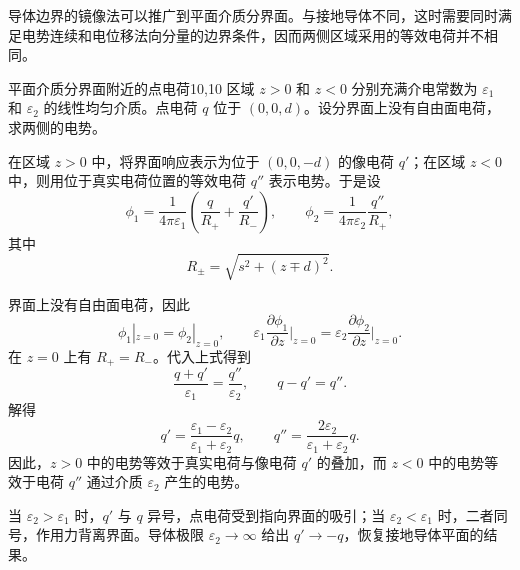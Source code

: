 导体边界的镜像法可以推广到平面介质分界面。与接地导体不同，这时需要同时满足电势连续和电位移法向分量的边界条件，因而两侧区域采用的等效电荷并不相同。

\begin{example}{平面介质分界面附近的点电荷}{10,10}
区域 $z>0$ 和 $z<0$ 分别充满介电常数为 $\varepsilon_{1}$ 和
$\varepsilon_{2}$ 的线性均匀介质。点电荷 $q$ 位于
$(0,0,d)$。设分界面上没有自由面电荷，求两侧的电势。

\begin{solution}
在区域 $z>0$ 中，将界面响应表示为位于 $(0,0,-d)$ 的像电荷
$q'$；在区域 $z<0$ 中，则用位于真实电荷位置的等效电荷 $q''$
表示电势。于是设
\[
\phi_{1}
=
\frac{1}{4\pi\varepsilon_{1}}
\left(
\frac{q}{R_{+}}
+
\frac{q'}{R_{-}}
\right),
\qquad
\phi_{2}
=
\frac{1}{4\pi\varepsilon_{2}}
\frac{q''}{R_{+}},
\]
其中
\[
R_{\pm}
=
\sqrt{s^{2}+(z\mp d)^{2}}.
\]

界面上没有自由面电荷，因此
\[
\phi_{1}|_{z=0}
=
\phi_{2}|_{z=0},
\qquad
\varepsilon_{1}
\frac{\partial\phi_{1}}{\partial z}\bigg|_{z=0}
=
\varepsilon_{2}
\frac{\partial\phi_{2}}{\partial z}\bigg|_{z=0}.
\]
在 $z=0$ 上有 $R_{+}=R_{-}$。代入上式得到
\[
\frac{q+q'}{\varepsilon_{1}}
=
\frac{q''}{\varepsilon_{2}},
\qquad
q-q'=q''.
\]
解得
\begin{equation}
	q'
	=
	\frac{\varepsilon_{1}-\varepsilon_{2}}
	{\varepsilon_{1}+\varepsilon_{2}}q,
	\qquad
	q''
	=
	\frac{2\varepsilon_{2}}
	{\varepsilon_{1}+\varepsilon_{2}}q.
	\label{eq:10:image-dielectric-charges}
\end{equation}
因此，$z>0$ 中的电势等效于真实电荷与像电荷 $q'$ 的叠加，而
$z<0$ 中的电势等效于电荷 $q''$ 通过介质 $\varepsilon_{2}$ 产生的电势。

当 $\varepsilon_{2}>\varepsilon_{1}$ 时，$q'$ 与 $q$ 异号，点电荷受到指向界面的吸引；当 $\varepsilon_{2}<\varepsilon_{1}$ 时，二者同号，作用力背离界面。导体极限
$\varepsilon_{2}\to\infty$ 给出 $q'\to-q$，恢复接地导体平面的结果。
\end{solution}
\end{example}


